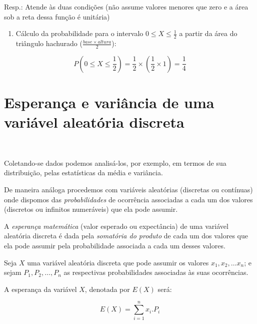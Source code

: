 \documentclass[
]{book}
\providecommand{\tightlist}{%
  \setlength{\itemsep}{0pt}\setlength{\parskip}{0pt}}
\begin{document}
Resp.: Atende às duas condições (não assume valores menores que zero e a área sob a reta dessa função é unitária)

\hfill\break

\begin{enumerate}
\def\labelenumi{(\alph{enumi})}
\setcounter{enumi}{1}
\tightlist
\item
  Cálculo da probabilidade para o intervalo \(0 \leq X \leq \frac{1}{2}\) a partir da área do triângulo hachurado (\(\frac{base \times altura}{2}\)):
\end{enumerate}

\hfill\break

\[
P ( 0 \leq X \leq \frac{1}{2}) = \frac{1}{2} \times (\frac{1}{2} \times 1 ) = \frac{1}{4} 
\]

\hypertarget{esperanuxe7a-e-variuxe2ncia-de-uma-variuxe1vel-aleatuxf3ria-discreta}{%
\section{Esperança e variância de uma variável aleatória discreta}\label{esperanuxe7a-e-variuxe2ncia-de-uma-variuxe1vel-aleatuxf3ria-discreta}}

~

Coletando-se dados podemos analisá-los, por exemplo, em termos de sua distribuição, pelas estatísticas da média e variância.

De maneira análoga procedemos com variáveis aleatórias (discretas ou contínuas) onde dispomos das \emph{probabilidades} de ocorrência associadas a cada um dos valores (discretos ou infinitos numeráveis) que ela pode assumir.

\hfill\break

A \emph{esperança matemática} (valor esperado ou expectância) de uma variável aleatória discreta é dada pela \emph{somatória do produto} de cada um dos valores que ela pode assumir pela probabilidade associada a cada um desses valores.

\hfill\break

Seja \(X\) uma variável aleatória discreta que pode assumir os valores \(x_{1},x_{2}, \dots x_{n}\); e sejam \(P_{1},P_{2}, \dots, P_{n}\) as respectivas probabilidades associadas às suas ocorrências.

\hfill\break

A esperança da variável \(X\), denotada por \(E(X)\) será:

\hfill\break

\[
E\left(X\right)=\sum _{i=1}^{n}{x}_{i}.{P}_{i}
\]
\end{document}
